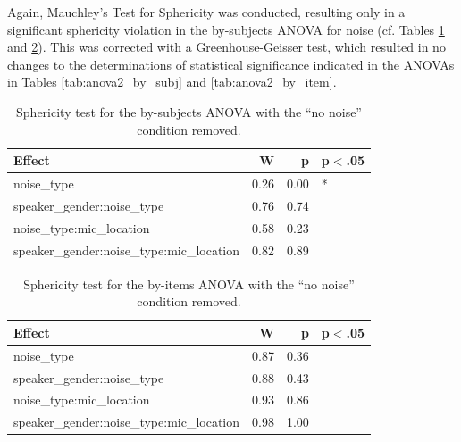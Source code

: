 \documentclass[dissertation,copyright]{uathesis}
\begin{document}
Again, Mauchley's Test for Sphericity was conducted, resulting only in a significant sphericity violation in the by-subjects ANOVA for noise (cf. Tables \ref{tab:anova2_subj_sph_test} and \ref{tab:anova2_item_sph_test}).  This was corrected with a Greenhouse-Geisser test, which resulted in no changes to the determinations of statistical significance indicated in the ANOVAs in Tables \ref{tab:anova2_by_subj} and \ref{tab:anova2_by_item}.
\begin{table}[ht]
\centering
\begin{tabular}{lrrl}
  \hline
Effect & W & p & p$<$.05 \\ 
  \hline
noise\_type & 0.26 & 0.00 & * \\ 
  speaker\_gender:noise\_type & 0.76 & 0.74 &  \\ 
  noise\_type:mic\_location & 0.58 & 0.23 &  \\ 
  speaker\_gender:noise\_type:mic\_location & 0.82 & 0.89 &  \\ 
   \hline
\end{tabular}
\caption{Sphericity test for the by-subjects ANOVA with the ``no noise'' condition removed.} 
\label{tab:anova2_subj_sph_test}
\end{table}
\begin{table}[ht]
\centering
\begin{tabular}{lrrl}
  \hline
Effect & W & p & p$<$.05 \\ 
  \hline
noise\_type & 0.87 & 0.36 &  \\ 
  speaker\_gender:noise\_type & 0.88 & 0.43 &  \\ 
  noise\_type:mic\_location & 0.93 & 0.86 &  \\ 
  speaker\_gender:noise\_type:mic\_location & 0.98 & 1.00 &  \\ 
   \hline
\end{tabular}
\caption{Sphericity test for the by-items ANOVA with the ``no noise'' condition removed.} 
\label{tab:anova2_item_sph_test}
\end{table}




\end{document}
